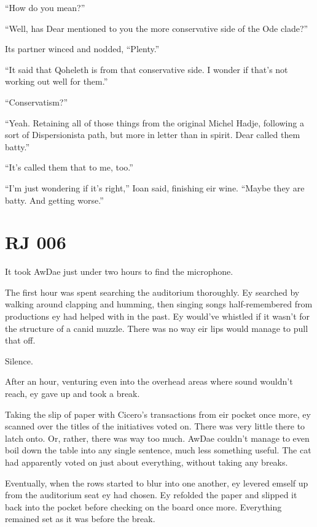 ``How do you mean?''

``Well, has Dear mentioned to you the more conservative side of the Ode clade?''

Its partner winced and nodded, ``Plenty.''

``It said that Qoheleth is from that conservative side. I wonder if that's not working out well for them.''

``Conservatism?''

``Yeah. Retaining all of those things from the original Michel Hadje, following a sort of Dispersionista path, but more in letter than in spirit. Dear called them batty.''

``It's called them that to me, too.''

``I'm just wondering if it's right,'' Ioan said, finishing eir wine. ``Maybe they are batty. And getting worse.''


\chapter*{RJ 006}

It took AwDae just under two hours to find the microphone.

The first hour was spent searching the auditorium thoroughly. Ey searched by walking around clapping and humming, then singing songs half-remembered from productions ey had helped with in the past. Ey would've whistled if it wasn't for the structure of a canid muzzle. There was no way eir lips would manage to pull that off.

Silence.

After an hour, venturing even into the overhead areas where sound wouldn't reach, ey gave up and took a break.

Taking the slip of paper with Cicero's transactions from eir pocket once more, ey scanned over the titles of the initiatives voted on. There was very little there to latch onto. Or, rather, there was way too much. AwDae couldn't manage to even boil down the table into any single sentence, much less something useful. The cat had apparently voted on just about everything, without taking any breaks.

Eventually, when the rows started to blur into one another, ey levered emself up from the auditorium seat ey had chosen. Ey refolded the paper and slipped it back into the pocket before checking on the board once more. Everything remained set as it was before the break.

